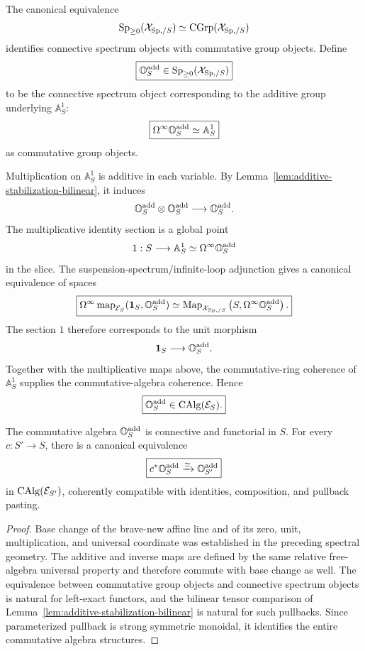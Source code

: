 \begin{construction}
\label{constr:additive-scalar-spectrum}
The canonical equivalence
\[
    \mathrm{Sp}_{\geq0}(\mathcal X_{\mathrm{Sp},/S})
    \simeq
    \operatorname{CGrp}(\mathcal X_{\mathrm{Sp},/S})
\]
identifies connective spectrum objects with commutative group objects.  Define
\[
\boxed{
    \mathbb O_S^{\mathrm{add}}
    \in
    \mathrm{Sp}_{\geq0}(\mathcal X_{\mathrm{Sp},/S})
}
\]
to be the connective spectrum object corresponding to the additive group underlying
\(\mathbb A^1_S\):
\[
\boxed{
    \Omega^\infty\mathbb O_S^{\mathrm{add}}
    \simeq
    \mathbb A^1_S
}
\]
as commutative group objects.

Multiplication on \(\mathbb A^1_S\) is additive in each variable.  By
Lemma~\ref{lem:additive-stabilization-bilinear}, it induces
\[
    \mathbb O_S^{\mathrm{add}}\otimes\mathbb O_S^{\mathrm{add}}
    \longrightarrow
    \mathbb O_S^{\mathrm{add}}.
\]
The multiplicative identity section is a global point
\[
    1:S\longrightarrow
    \mathbb A^1_S
    \simeq
    \Omega^\infty\mathbb O_S^{\mathrm{add}}
\]
in the slice.  The suspension-spectrum/infinite-loop adjunction gives a canonical equivalence of
spaces
\[
\boxed{
    \Omega^\infty
    \operatorname{map}_{\mathcal E_S}(\mathbf 1_S,\mathbb O_S^{\mathrm{add}})
    \simeq
    \operatorname{Map}_{\mathcal X_{\mathrm{Sp},/S}}
    \left(S,\Omega^\infty\mathbb O_S^{\mathrm{add}}\right).
}
\]
The section \(1\) therefore corresponds to the unit morphism
\[
    \mathbf 1_S\longrightarrow\mathbb O_S^{\mathrm{add}}.
\]
Together with the multiplicative maps above, the commutative-ring coherence of
\(\mathbb A^1_S\) supplies the commutative-algebra coherence.  Hence
\[
\boxed{
    \mathbb O_S^{\mathrm{add}}\in\operatorname{CAlg}(\mathcal E_S).
}
\]
\end{construction}

\begin{proposition}
\label{prop:additive-scalar-spectrum-base-change}
The commutative algebra \(\mathbb O_S^{\mathrm{add}}\) is connective and functorial in \(S\).  For every
\(c:S'\to S\), there is a canonical equivalence
\[
\boxed{
    c^*\mathbb O_S^{\mathrm{add}}
    \xrightarrow{\simeq}
    \mathbb O_{S'}^{\mathrm{add}}
}
\]
in \(\operatorname{CAlg}(\mathcal E_{S'})\), coherently compatible with identities, composition, and pullback
pasting.
\end{proposition}

\begin{proof}
Base change of the brave-new affine line and of its zero, unit, multiplication, and universal
coordinate was established in the preceding spectral geometry.  The additive and inverse maps are
defined by the same relative free-algebra universal property and therefore commute with base change
as well.  The equivalence between commutative group objects and connective spectrum objects is
natural for left-exact functors, and the bilinear tensor comparison of
Lemma~\ref{lem:additive-stabilization-bilinear} is natural for such pullbacks.  Since parameterized
pullback is strong symmetric monoidal, it identifies the entire commutative algebra structures.
\end{proof}

